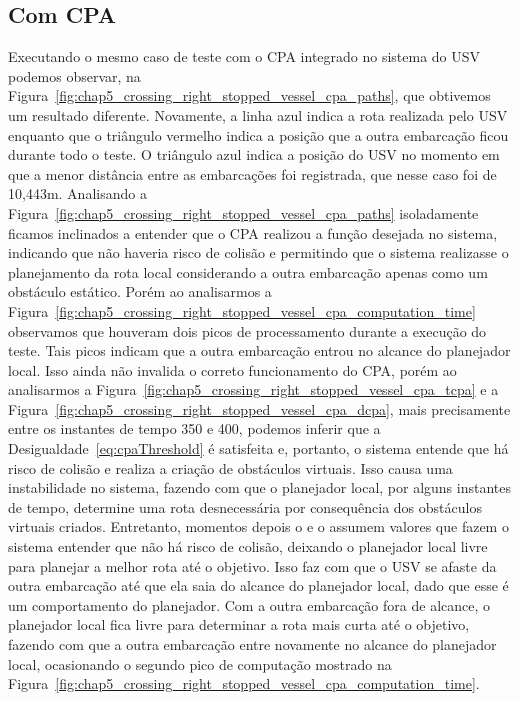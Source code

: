         \subsection{Com CPA}\label{subsection_crossing_right_stopped_vessel_cpa}
            Executando o mesmo caso de teste com o CPA integrado no sistema do USV podemos observar, na Figura~\ref{fig:chap5_crossing_right_stopped_vessel_cpa_paths}, que obtivemos um resultado diferente. Novamente, a linha azul indica a rota realizada pelo USV enquanto que o triângulo vermelho indica a posição que a outra embarcação ficou durante todo o teste. O triângulo azul indica a posição do USV no momento em que a menor distância entre as embarcações foi registrada, que nesse caso foi de 10,443m. Analisando a Figura~\ref{fig:chap5_crossing_right_stopped_vessel_cpa_paths} isoladamente ficamos inclinados a entender que o CPA realizou a função desejada no sistema, indicando que não haveria risco de colisão e permitindo que o sistema realizasse o planejamento da rota local considerando a outra embarcação apenas como um obstáculo estático. Porém ao analisarmos a Figura~\ref{fig:chap5_crossing_right_stopped_vessel_cpa_computation_time} observamos que houveram dois picos de processamento durante a execução do teste. Tais picos indicam que a outra embarcação entrou no alcance do planejador local. Isso ainda não invalida o correto funcionamento do CPA, porém ao analisarmos a Figura~\ref{fig:chap5_crossing_right_stopped_vessel_cpa_tcpa} e a Figura~\ref{fig:chap5_crossing_right_stopped_vessel_cpa_dcpa}, mais precisamente entre os instantes de tempo 350 e 400, podemos inferir que a Desigualdade~\ref{eq:cpaThreshold} é satisfeita e, portanto, o sistema entende que há risco de colisão e realiza a criação de obstáculos virtuais. Isso causa uma instabilidade no sistema, fazendo com que o planejador local, por alguns instantes de tempo, determine uma rota desnecessária por consequência dos obstáculos virtuais criados. Entretanto, momentos depois o \tcpa e o \dcpa assumem valores que fazem o sistema entender que não há risco de colisão, deixando o planejador local livre para planejar a melhor rota até o objetivo. Isso faz com que o USV se afaste da outra embarcação até que ela saia do alcance do planejador local, dado que esse é um comportamento do planejador. Com a outra embarcação fora de alcance, o planejador local fica livre para determinar a rota mais curta até o objetivo, fazendo com que a outra embarcação entre novamente no alcance do planejador local, ocasionando o segundo pico de computação mostrado na Figura~\ref{fig:chap5_crossing_right_stopped_vessel_cpa_computation_time}.
        
